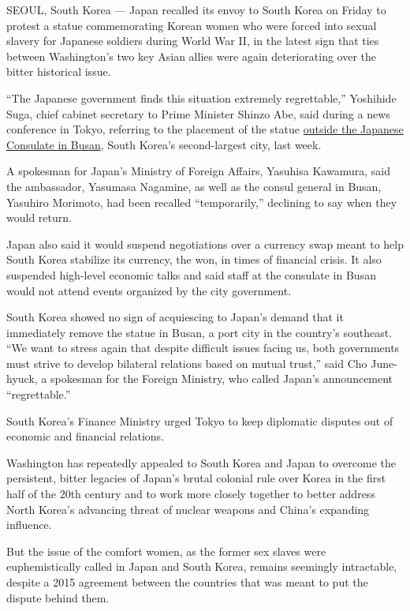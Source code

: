 SEOUL, South Korea --- Japan recalled its envoy to South Korea on Friday
to protest a statue commemorating Korean women who were forced into
sexual slavery for Japanese soldiers during World War II, in the latest
sign that ties between Washington's two key Asian allies were again
deteriorating over the bitter historical issue.

``The Japanese government finds this situation extremely regrettable,''
Yoshihide Suga, chief cabinet secretary to Prime Minister Shinzo Abe,
said during a news conference in Tokyo, referring to the placement of
the statue
\href{http://www.nytimes.com/2016/12/30/world/asia/south-korea-comfort-women-wwii-japan.html}{outside
the Japanese Consulate in Busan}, South Korea's second-largest city,
last week.

A spokesman for Japan's Ministry of Foreign Affairs, Yasuhisa Kawamura,
said the ambassador, Yasumasa Nagamine, as well as the consul general in
Busan, Yasuhiro Morimoto, had been recalled ``temporarily,'' declining
to say when they would return.

Japan also said it would suspend negotiations over a currency swap meant
to help South Korea stabilize its currency, the won, in times of
financial crisis. It also suspended high-level economic talks and said
staff at the consulate in Busan would not attend events organized by the
city government.

South Korea showed no sign of acquiescing to Japan's demand that it
immediately remove the statue in Busan, a port city in the country's
southeast. ``We want to stress again that despite difficult issues
facing us, both governments must strive to develop bilateral relations
based on mutual trust,'' said Cho June-hyuck, a spokesman for the
Foreign Ministry, who called Japan's announcement ``regrettable.''

South Korea's Finance Ministry urged Tokyo to keep diplomatic disputes
out of economic and financial relations.

Washington has repeatedly appealed to South Korea and Japan to overcome
the persistent, bitter legacies of Japan's brutal colonial rule over
Korea in the first half of the 20th century and to work more closely
together to better address North Korea's advancing threat of nuclear
weapons and China's expanding influence.

But the issue of the comfort women, as the former sex slaves were
euphemistically called in Japan and South Korea, remains seemingly
intractable, despite a 2015 agreement between the countries that was
meant to put the dispute behind them.

